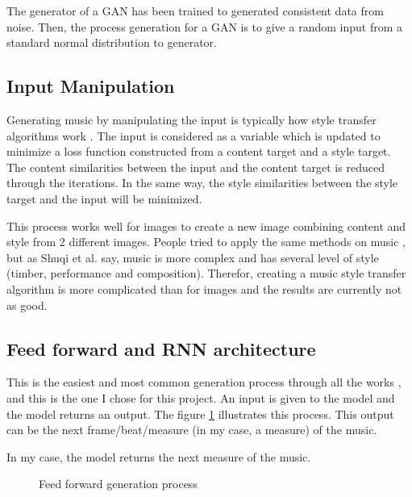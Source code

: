 \documentclass[12pt]{report}
\begin{document}
The generator of a GAN has been trained to generated consistent data from noise.
Then, the process generation for a GAN is to give a random input from a standard normal distribution to generator.

\subsection{Input Manipulation}

Generating music by manipulating the input is typically how style transfer algorithms work \cite{shetty_neural_2019, gatys_neural_2015, li_universal_2017}.
The input is considered as a variable which is updated to minimize a loss function constructed from a content target and a style target.
The content similarities between the input and the content target is reduced through the iterations.
In the same way, the style similarities between the style target and the input will be minimized.

This process works well for images to create a new image combining content and style from 2 different images.
People tried to apply the same methods on music \cite{kaliakatsos-papakostas_conceptual_2017, hung_musical_2019, brunner_symbolic_2018, lu_play_2018}, but as Shuqi et al. \cite{dai_music_2018} say, music is more complex and has several level of style (timber, performance and composition).
Therefor, creating a music style transfer algorithm is more complicated than for images and the results are currently not as good.

\subsection{Feed forward and RNN architecture}
\label{sec:rw:feed-forward}

This is the easiest and most common generation process through all the works \cite{liang_automatic_2017, chuan_modeling_nodate, huang_counterpoint_2017, wu_hierarchical_2018}, and this is the one I chose for this project.
An input is given to the model and the model returns an output.
The figure \ref{fig:feed_forward_generation_process} illustrates this process.
This output can be the next frame/beat/measure (in my case, a measure) of the music.

In my case, the model returns the next measure of the music.

\begin{figure}[h]
\begin{center}
\caption{Feed forward generation process}
\label{fig:feed_forward_generation_process}
\end{center}
\end{figure}
\end{document}
